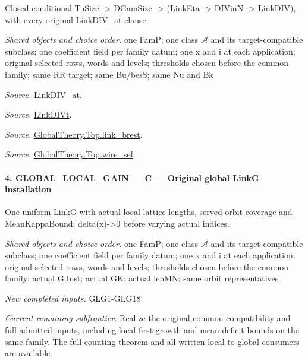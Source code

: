 \documentclass[11pt,a4paper]{article}
\numberwithin{equation}{section}
\theoremstyle{remark}\newtheorem{remark}[theorem]{Remark}
\begin{document}
Closed conditional TuSize -> DGamSize -> (LinkEta -> DIVinN -> LinkDIV), with every original LinkDIV\_\allowbreak at clause.

\emph{Shared objects and choice order.} one FamP; one class $\mathcal A$ and its target-compatible subclass; one coefficient field per family datum; one x and i at each application; original selected rows, words and levels; thresholds chosen before the common family; same RR target; same Bu/besS; same Nu and Bk

\emph{Source.} \href{https://github.com/CocoSgt/riemann-hypothesis-lean/blob/7cbf7a0c32fca1badf05931879a37c3f8a2b03b4/src/Formalism/SharpRestriction/GlobalTheoremInputs.lean#L77-L90}{LinkDIV\_\allowbreak at}.

\emph{Source.} \href{https://github.com/CocoSgt/riemann-hypothesis-lean/blob/7cbf7a0c32fca1badf05931879a37c3f8a2b03b4/src/Formalism/SharpRestriction/GlobalTheoremInputs.lean#L94-L96}{LinkDIVt}.

\emph{Source.} \href{https://github.com/CocoSgt/riemann-hypothesis-lean/blob/7cbf7a0c32fca1badf05931879a37c3f8a2b03b4/src/Development/AbelianVarietyTheory/Proofs/GlobalInterpolation/LinkBrest.lean#L7-L25}{GlobalTheory.Top.link\_\allowbreak brest}.

\emph{Source.} \href{https://github.com/CocoSgt/riemann-hypothesis-lean/blob/7cbf7a0c32fca1badf05931879a37c3f8a2b03b4/src/Development/AbelianVarietyTheory/Proofs/GlobalInterpolation/WireSel.lean#L11-L41}{GlobalTheory.Top.wire\_\allowbreak sel}.



\paragraph{4. GLOBAL\_\allowbreak LOCAL\_\allowbreak GAIN — C — Original global LinkG installation}

One uniform LinkG with actual local lattice lengths, served-orbit coverage and MeanKappaBound; delta(x)->0 before varying actual indices.

\emph{Shared objects and choice order.} one FamP; one class $\mathcal A$ and its target-compatible subclass; one coefficient field per family datum; one x and i at each application; original selected rows, words and levels; thresholds chosen before the common family; actual G.Inst; actual GK; actual lenMN; same orbit representatives

\emph{New completed inputs.} GLG1-GLG18

\emph{Current remaining subfrontier.} Realize the original common compatibility and full admitted inputs, including local first-growth and mean-deficit bounds on the same family. The full counting theorem and all written local-to-global consumers are available.
\end{document}
